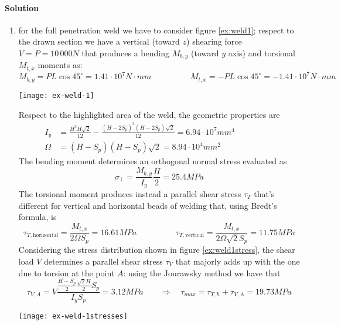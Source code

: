 	\paragraph{Solution}
\begin{enumerate}
	\item for the full penetration weld we have to consider figure \ref{ex:weld1}; respect to the drawn section we have a vertical (toward $z$) shearing force $V = P= 10\,000N$ that produces a bending $M_{b,y}$ (toward $y$ axis) and torsional $M_{t,x}$ moments as:
	\[ M_{b,y} =  PL \cos 45^\circ = 1.41\cdot 10^7 N \cdot mm \hspace{2cm} M_{t,x} = - PL \cos 45^\circ = -1.41\cdot 10^7 N \cdot mm  \]
	
	\begin{SCfigure}[1.5][bht]
		\centering \texttt{[image: ex-weld-1]} 
		\caption{full penetration joint and related axis system in order to verify the weld.}
		\label{ex:weld1}
	\end{SCfigure}
	
	Respect to the highlighted area of the weld, the geometric properties are
	\begin{align*}
		I_y & = \frac{H^3 H \sqrt 2}{12} - \frac{(H-2S_p)^3(H-2S_p)\sqrt 2}{12} = 6.94 \cdot 10^7 mm ^4 \hspace{2cm} \\ \Omega & = (H - S_p)(H-S_p)\sqrt 2 = 8.94 \cdot 10^4 mm^2
	\end{align*}
	The bending moment determines an orthogonal normal stress evaluated as
	\[ \sigma_\perp = \frac{M_{b,y}}{I_y} \frac H 2 = 25.4MPa \]
	The torsional moment produces instead a parallel shear stress $\tau_{T}$ that's different for vertical and horizontal beads of welding that, using Bredt's formula, is
	\[ \tau_{T,\textrm{horizontal}} = \frac{M_{t,x}}{2 \Omega S_p} = 16.61MPa \hspace{2cm} \tau_{T,\textrm{vertical}} = \frac{M_{t,x}}{2 \Omega \sqrt 2 S_p} = 11.75MPa  \]
	Considering the stress distribution shown in figure \ref{ex:weld1stress}, the shear load $V$ determines a parallel shear stress $\tau_V$ that majorly adds up with the one due to torsion at the point $A$: using the Jourawsky method we have that
	\[ \tau_{V,A} = V \frac{\frac{H-S_p}{2} \frac{\sqrt 2 H}{2} S_p}{I_y S_p} = 3.12 MPa \qquad \Rightarrow \quad \tau_{max} = \tau_{T,h} + \tau_{V,A} = 19.73MPa \]
	
	\begin{SCfigure}[1][bht]
		\centering \texttt{[image: ex-weld-1stresses]}
		\caption{stress distribution in the cross-section.} \label{ex:weld1stress}
	\end{SCfigure}
	

\end{enumerate}
